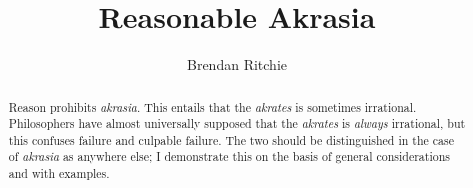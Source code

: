 \documentclass[11pt,letterpaper,oneside]{amsart}
\author{Brendan Ritchie}
\title{Reasonable Akrasia}
\begin{document}
\maketitle





\begin{abstract}Reason prohibits \emph{akrasia}. This entails that the \emph{akrates} is sometimes irrational. Philosophers have almost universally supposed that the \emph{akrates} is \emph{always} irrational, but this confuses failure and culpable failure. The two should be distinguished in the case of \emph{akrasia} as anywhere else; I demonstrate this on the basis of general considerations and with examples.\end{abstract}









\end{document}
